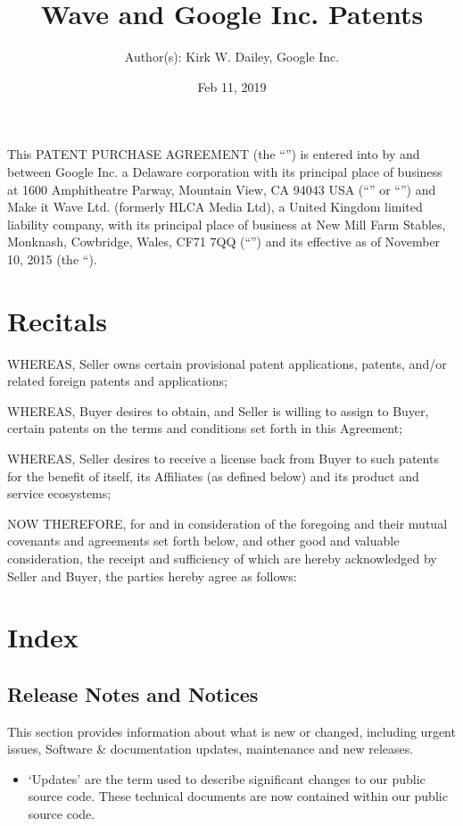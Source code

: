 \documentclass[letterpaper,10pt,openany,oneside,english]{sphinxmanual}
\title{Wave and Google Inc. Patents}
\date{Feb 11, 2019}
\author{Author(s): Kirk W. Dailey, Google Inc.}
\begin{document}
\maketitle
\sphinxtableofcontents
{}\label{\detokenize{index::doc}}


This PATENT PURCHASE AGREEMENT (the “”) is entered into by and between Google Inc. a Delaware corporation with its principal place of business at 1600 Amphitheatre Parway, Mountain View, CA 94043 USA (“” or “”) and Make it Wave Ltd. (formerly HLCA Media Ltd), a United Kingdom limited liability company, with its principal place of business at New Mill Farm Stables, Monknash, Cowbridge, Wales, CF71 7QQ (“”) and its effective as of November 10, 2015 (the “).


\chapter{Recitals}
\label{\detokenize{index:recitals}}
WHEREAS, Seller owns certain provisional patent applications, patents, and/or related foreign patents and applications;

WHEREAS, Buyer desires to obtain, and Seller is willing to assign to Buyer, certain patents on the terms and conditions set forth in this Agreement;

WHEREAS, Seller desires to receive a license back from Buyer to such patents for the benefit of itself, its Affiliates (as defined below) and its product and service ecosystems;

NOW THEREFORE, for and in consideration of the foregoing and their mutual covenants and agreements set forth below, and other good and valuable consideration, the receipt and sufficiency of which are hereby acknowledged by Seller and Buyer, the parties hereby agree as follows:


\chapter{Index}
\label{\detokenize{index:index}}

\section{Release Notes and Notices}
\label{\detokenize{releasenotes:release-notes-and-notices}}\label{\detokenize{releasenotes::doc}}
This section provides information about what is new or changed, including urgent issues, Software \& documentation updates, maintenance and new releases.
\begin{itemize}
\item {} 
‘Updates’ are the term used to describe significant changes to our public source code. These technical documents are now contained within our public source code.

\end{itemize}
\end{document}

